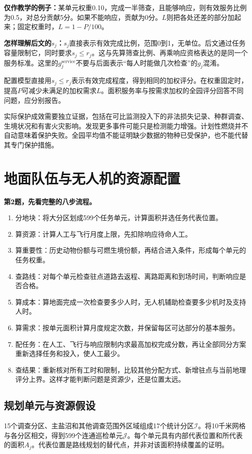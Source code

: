 \documentclass[12pt,a4paper]{article}
\numberwithin{equation}{section}
\begin{document}
\noindent\textbf{仅作教学的例子：}某单元权重0.10，完成一半筛查，且能够响应，则有效服务比例为0.5，对总分贡献5分。如果不能响应，贡献为0分。$L$则把各处还差的部分加起来；固定权重时，$L=1-P/100$。

\noindent\textbf{怎样理解后文的$s_j$：}$s_j$直接表示有效完成比例，范围0到1，无单位。后文通过任务容量限制它，同时要求$s_j\le r_j$。这与先算筛查比例、再乘响应资格表达的是同一个服务标准。这里的$g_j^{\mathrm{service}}$不要与后面表示“每人时能做几次检查”的$g_j$混淆。

配置模型直接用$s_j\le r_j$表示有效完成程度，得到相同的加权评分。在权重固定时，提高$P$可减少未满足的加权需求$L$。面积服务率与按需求加权的全园评分回答不同问题，应分别报告。

实际保护成效需要独立证据，包括在可比监测投入下的非法损失记录、种群调查、生境状况和有害火灾影响。发现更多事件可能只是检测能力增强。计划性燃烧并不自动意味着保护失败。全园平均值不能证明缺少数据的物种已受保护，也不能代替其专门保护措施。
\clearpage

\section{地面队伍与无人机的资源配置}
\noindent\textbf{第2题，先看完整的八步流程。}
\begin{enumerate}
\item 分地块：将大分区划成599个任务单元，计算面积并选任务代表位置。
\item 算资源：计算人工与飞行月度上限，先扣除响应待命人工。
\item 算重要性：历史动物份额与可燃生境份额，再结合进入条件，形成每个单元的任务权重。
\item 查路线：对每个单元检查驻点道路去返程、离路距离和到场时间，判断响应是否合格。
\item 算成本：算地面完成一次检查要多少人时，无人机辅助检查要多少机时及支持人时。
\item 算需求：按单元面积计算月度规定次数，并保留每区可达部分的基本服务。
\item 配任务：在人工、飞行与响应限制内求最高加权完成分数，再让全部同分方案重新选择任务和投入，使人工最少。
\item 查结果：重新核对所有工时和限制，比较其他分配方式、新增驻点与当前地理评分上界。这样才能判断问题是资源少，还是位置太远。
\end{enumerate}

\subsection{规划单元与资源假设}
15个调查分区、主盐沼和其他调查范围外区域组成17个统计分区$\mathcal I$。将10千米网格与各分区相交，得到599个连通巡检单元$\mathcal J$。每个单元具有内部代表位置和所代表的面积$A_j$。代表位置是路线规划的替代点，并非对该面积持续覆盖的证明。
\end{document}
